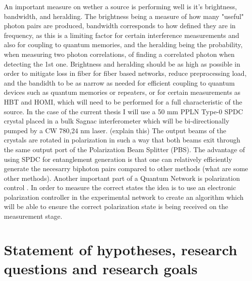 \documentclass{article}
\theoremstyle{mytheoremstyle}
\theoremstyle{mytheoremstyle}
\theoremstyle{myproblemstyle}
\begin{document}
An important measure on wether a source is performing well is it's brightness, bandwidth, and heralding. The brightness being a measure of how many "useful" photon pairs are produced,
bandwidth corresponds to how defined they are in frequency, as this is a limiting factor for certain interference measurements and also for coupling
to quantum memories, and the heralding being the probability, when measuring two photon correlations,
of finding a correlated photon when detecting the 1st one.
Brightness and heralding should be as high as possible in order to mitigate loss in fiber for fiber based networks,
reduce preprocessing load, and the bandidth to be as narrow as needed for efficient coupling to quantum devices such as quantum memories or repeaters, 
or for certain measurements as HBT and HOMI, which will need to be performed for a full characteristic of the source.
In the case of the current thesis I will use a 50 mm PPLN Type-0 SPDC crystal placed in a bulk Sagnac interferometer which will be bi-directionally 
pumped by a CW 780,24 nm laser. (explain this)
The output beams of the crystals are rotated in polarization in such a way that both beams exit through the same output port of the Polarization Beam Splitter (PBS).
The advantage of using SPDC for entanglement generation is that one can relatively efficiently generate the necesarry biphoton pairs compared to other methods (what are some other methods).
Another important part of a Quantum Network is polarization control \cite{CCSHDCDRS}. In order to measure the correct states the 
idea is to use an electronic polarization controller in the experimental network to create an algorithm which will be able to 
ensure the correct polarization state is being received on the measurement stage.




\newpage
\section{Statement of hypotheses, research questions and research goals}
\end{document}
